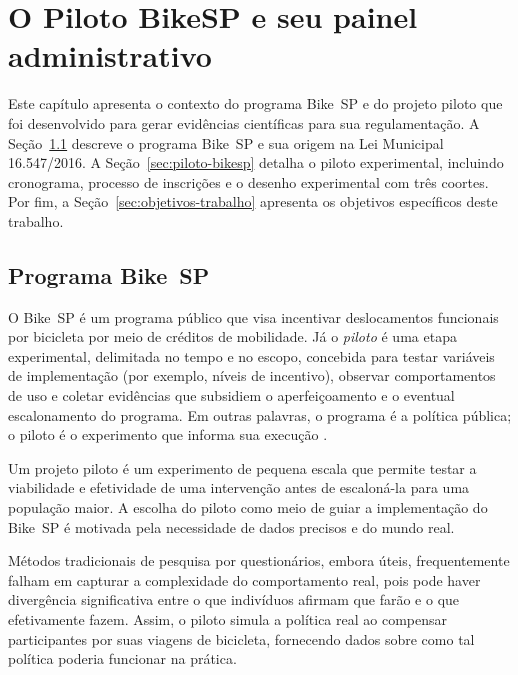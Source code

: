 
\chapter{O Piloto BikeSP e seu painel administrativo}
\label{cap:contexto-painel}

Este capítulo apresenta o contexto do programa Bike~SP e do projeto piloto que foi desenvolvido para gerar evidências científicas para sua regulamentação. A Seção~\ref{sec:programa-bikesp} descreve o programa Bike~SP e sua origem na Lei Municipal 16.547/2016. A Seção~\ref{sec:piloto-bikesp} detalha o piloto experimental, incluindo cronograma, processo de inscrições e o desenho experimental com três coortes. Por fim, a Seção~\ref{sec:objetivos-trabalho} apresenta os objetivos específicos deste trabalho.

\section{Programa Bike~SP}
\label{sec:programa-bikesp}
O Bike~SP é um programa público que visa incentivar deslocamentos funcionais por
bicicleta por meio de créditos de mobilidade. Já o \textit{piloto} é uma etapa
experimental, delimitada no tempo e no escopo, concebida para testar variáveis
de implementação (por exemplo, níveis de incentivo), observar comportamentos de
uso e coletar evidências que subsidiem o aperfeiçoamento e o eventual
escalonamento do programa. Em outras palavras, o programa é a política pública;
o piloto é o experimento que informa sua execução
\citep{faria2023:bikespCaseStudy, interscity:pilotoBikeSP}.

Um projeto piloto é um experimento de pequena escala que permite testar a
viabilidade e efetividade de uma intervenção antes de escaloná-la para uma
população maior\citep{pearson2020}. A escolha do piloto como meio de guiar a
implementação do Bike~SP é motivada pela necessidade de dados precisos e do
mundo real.

Métodos tradicionais de pesquisa por questionários, embora úteis, frequentemente
falham em capturar a complexidade do comportamento real, pois pode haver
divergência significativa entre o que indivíduos afirmam que farão e o que
efetivamente fazem\citep{rundle2009}. Assim, o piloto simula a política real ao
compensar participantes por suas viagens de bicicleta, fornecendo dados sobre
como tal política poderia funcionar na prática.


